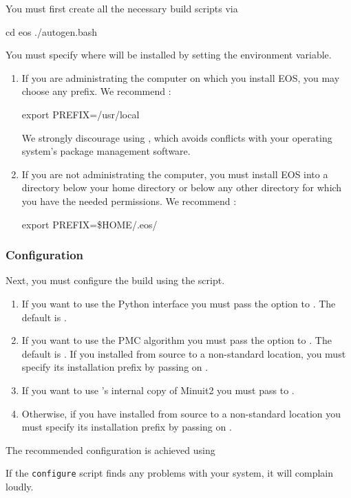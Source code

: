 You must first create all the necessary build scripts via
%
\begin{commandline}
cd eos
./autogen.bash
\end{commandline}
%
You must specify where \EOS will be installed by setting the 
environment variable.
\begin{enumerate}
    \item If you are administrating the computer on which you install EOS,
    you may choose any prefix. We recommend :
\begin{commandline}
export PREFIX=/usr/local
\end{commandline}
    We strongly discourage using , which avoids conflicts with
    your operating system's package management software.
    \item If you are not administrating the computer, you must install EOS into
    a directory below your home directory or below any other directory for which
    you have the needed permissions. We recommend :
\begin{commandline}
export PREFIX=\$HOME/.eos/
\end{commandline}
\end{enumerate}

\subsubsection{Configuration}

Next, you must configure the \EOS build using the  script.
\begin{enumerate}
    \item If you want to use the \EOS Python interface you must pass the  option
    to . The default is .

    \item If you want to use the \EOS \gls{PMC} algorithm you must pass the  option
    to . The default is .
    If you installed  from source to a non-standard location,
    you must specify its installation prefix by passing on
    .

    \item If you want to use 's internal copy of Minuit2 you must
    pass  to .

    \item Otherwise, if you have installed  from source to a non-standard location
    you must specify its installation prefix by passing on
    .
\end{enumerate}
%
The recommended configuration is achieved using
If the \texttt{configure} script finds any problems with your system, it will complain loudly.\\


